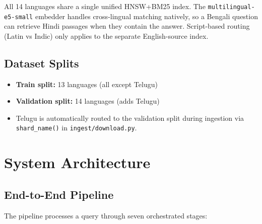 \documentclass[12pt,a4paper]{article}
\begin{document}
\begin{notebox}
All 14 languages share a single unified HNSW+BM25 index. The \texttt{multilingual-e5-small} embedder handles cross-lingual matching natively, so a Bengali question can retrieve Hindi passages when they contain the answer. Script-based routing (Latin vs Indic) only applies to the separate English-source index.
\end{notebox}

\subsection{Dataset Splits}

\begin{itemize}
    \item \textbf{Train split:} 13 languages (all except Telugu)
    \item \textbf{Validation split:} 14 languages (adds Telugu)
    \item Telugu is automatically routed to the validation split during ingestion via \texttt{shard\_name()} in \texttt{ingest/download.py}.
\end{itemize}


\section{System Architecture}

\subsection{End-to-End Pipeline}

The pipeline processes a query through seven orchestrated stages:
\end{document}
